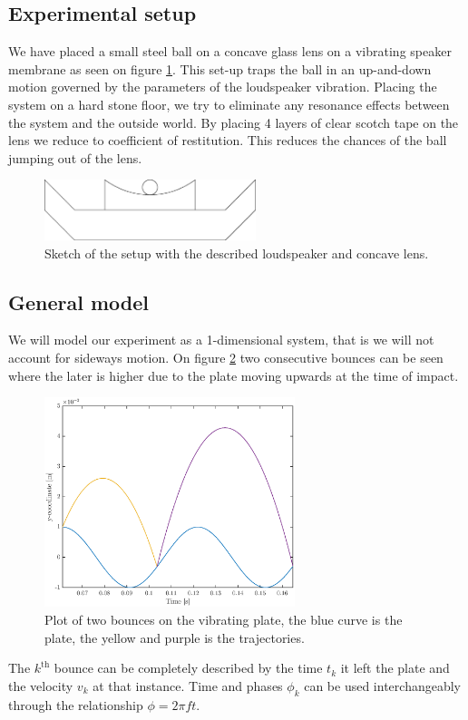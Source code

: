 \documentclass[12pt,oneside,a4paper]{article}
\numberwithin{equation}{section}
\begin{document}
{{{{\subsection{Experimental setup}
We have placed a small steel ball on a concave glass lens on a vibrating speaker membrane as seen on figure \ref{sketch}. This set-up traps the ball in an up-and-down motion governed by the parameters of the loudspeaker vibration. Placing the system on a hard stone floor, we try to eliminate any resonance effects between the system and the outside world. By placing 4 layers of clear scotch tape on the lens we 
reduce to coefficient of restitution. This reduces the chances of the ball jumping out of the lens. 
\begin{figure}[h]
	\centering
	\includegraphics[width=0.55\textwidth]{speaker}
	\caption{Sketch of the setup with the described loudspeaker and concave lens.}
	\label{sketch}
\end{figure}
\subsection{General model}
We will model our experiment as a 1-dimensional system, that is we will not 
account for sideways motion. On figure \ref{bounces} two consecutive bounces 
can be seen where the later is higher due to the plate  moving upwards at the 
time of impact.
\begin{figure}[h]
	\centering
	\includegraphics[width=0.65\textwidth]{Figures/bounceplot.eps}
	\caption{Plot of two bounces on the vibrating plate, the blue curve is the plate, the yellow and purple is the trajectories.}
	\label{bounces}
\end{figure}
The $k^{\text{th}}$ bounce can be completely described by the time $t_k$ it left the plate and the velocity $v_k$ at that instance. Time and phases $\phi_k$ can be used interchangeably through the relationship $\phi=2\pi f t$.

}}}}
\end{document}
